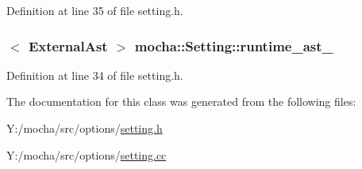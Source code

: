 Definition at line 35 of file setting.h.

\hypertarget{classmocha_1_1_setting_a5cb9c6885050b289f78e040839bb6e65}{
\subsubsection[{runtime\_\-ast\_\-}]{$<$ {\bf ExternalAst} $>$ {\bf mocha::Setting::runtime\_\-ast\_\-}}}
\label{classmocha_1_1_setting_a5cb9c6885050b289f78e040839bb6e65}


Definition at line 34 of file setting.h.



The documentation for this class was generated from the following files:\begin{DoxyCompactItemize}
\item 
Y:/mocha/src/options/\hyperlink{setting_8h}{setting.h}\item 
Y:/mocha/src/options/\hyperlink{setting_8cc}{setting.cc}\end{DoxyCompactItemize}
